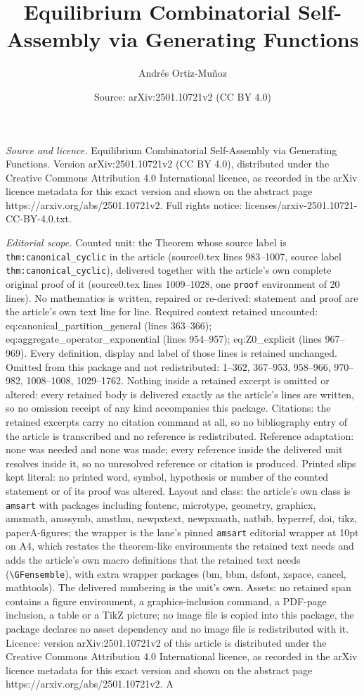 \documentclass[10pt,a4paper]{amsart}
\title[Equilibrium Combinatorial Self-Assembly via Generating Funct]{Equilibrium Combinatorial Self-Assembly via Generating Functions}
\author{Andr\'es Ortiz-Mu\~noz}
\date{Source: arXiv:2501.10721v2 (CC BY 4.0)}
\begin{document}
\maketitle

\noindent\emph{Source and licence.} Equilibrium Combinatorial Self-Assembly via Generating Functions. Version arXiv:2501.10721v2 (CC BY 4.0), distributed under the Creative Commons Attribution 4.0 International licence, as recorded in the arXiv licence metadata for this exact version and shown on the abstract page https://arxiv.org/abs/2501.10721v2. Full rights notice: licenses/arxiv-2501.10721-CC-BY-4.0.txt.\par\smallskip

\noindent\textit{Editorial scope.} Counted unit: the Theorem whose source label is \texttt{thm:canonical\_cyclic} in the article (source0.tex lines 983--1007, source label \texttt{thm:canonical\_cyclic}), delivered together with the article's own complete original proof of it (source0.tex lines 1009--1028, one \texttt{proof} environment of 20 lines). No mathematics is written, repaired or re-derived: statement and proof are the article's own text line for line. Required context retained uncounted: eq:canonical\_partition\_general (lines 363--366); eq:aggregate\_operator\_exponential (lines 954--957); eq:Z0\_explicit (lines 967--969). Every definition, display and label of those lines is retained unchanged. Omitted from this package and not redistributed: 1--362, 367--953, 958--966, 970--982, 1008--1008, 1029--1762. Nothing inside a retained excerpt is omitted or altered: every retained body is delivered exactly as the article's lines are written, so no omission receipt of any kind accompanies this package. Citations: the retained excerpts carry no citation command at all, so no bibliography entry of the article is transcribed and no reference is redistributed. Reference adaptation: none was needed and none was made; every reference inside the delivered unit resolves inside it, so no unresolved reference or citation is produced. Printed slips kept literal: no printed word, symbol, hypothesis or number of the counted statement or of its proof was altered. Layout and class: the article's own class is \texttt{amsart} with packages including fontenc, microtype, geometry, graphicx, amsmath, amssymb, amsthm, newpxtext, newpxmath, natbib, hyperref, doi, tikz, paperA-figures; the wrapper is the lane's pinned \texttt{amsart} editorial wrapper at 10pt on A4, which restates the theorem-like environments the retained text needs and adds the article's own macro definitions that the retained text needs (\texttt{\textbackslash GFensemble}), with extra wrapper packages (bm, bbm, dsfont, xspace, cancel, mathtools). The delivered numbering is the unit's own. Assets: no retained span contains a figure environment, a graphics-inclusion command, a PDF-page inclusion, a table or a TikZ picture; no image file is copied into this package, the package declares no asset dependency and no image file is redistributed with it. Licence: version arXiv:2501.10721v2 of this article is distributed under the Creative Commons Attribution 4.0 International licence, as recorded in the arXiv licence metadata for this exact version and shown on the abstract page https://arxiv.org/abs/2501.10721v2. A 
\end{document}
